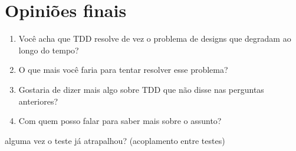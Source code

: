 \section{Opiniões finais}

\begin{enumerate}
	\item Você acha que TDD resolve de vez o problema de designs que degradam ao longo do tempo?
	\item O que mais você faria para tentar resolver esse problema?
	\item Gostaria de dizer mais algo sobre TDD que não disse nas perguntas anteriores?
	\item Com quem posso falar para saber mais sobre o assunto?
\end{enumerate}


alguma vez o teste já atrapalhou? (acoplamento entre testes)